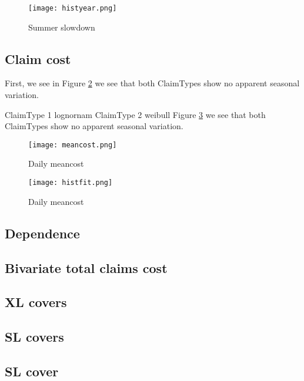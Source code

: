 \documentclass[11pt]{article}
\begin{document}
 \begin{figure}[!ht]
 \center
  \texttt{[image: histyear.png]}
  \caption{Summer slowdown}
  \label{fig:samplefig1}
\end{figure}


\subsection*{Claim cost}
First,  we see in Figure \ref{fig:samplefig2} we see that both ClaimTypes show no apparent seasonal variation.

ClaimType 1 lognornam
ClaimType 2 weibull
 Figure \ref{fig:samplefig3} we see that both ClaimTypes show no apparent seasonal variation.


 \begin{figure}[!ht]
 \center
  \texttt{[image: meancost.png]}
  \caption{Daily meancost}
  \label{fig:samplefig2}
\end{figure}

 \begin{figure}[!ht]
 \center
  \texttt{[image: histfit.png]}
  \caption{Daily meancost}
  \label{fig:samplefig3}
\end{figure}

\subsection*{Dependence}

\subsection*{Bivariate total claims cost}

\subsection*{XL covers}

\subsection*{SL covers}

\subsection*{SL cover}






%
\end{document}
